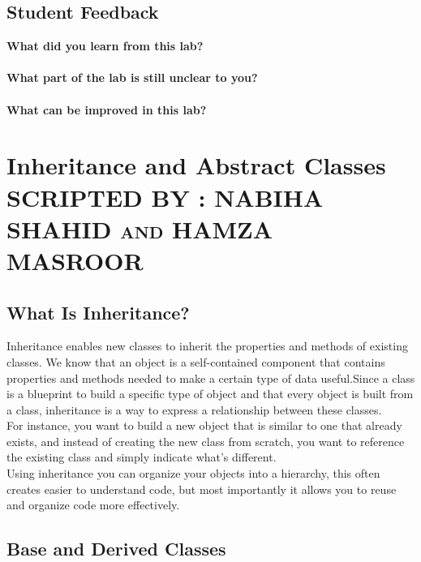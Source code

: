 \documentclass[11pt,fleqn]{book} %
\begin{document}
\newpage
\section{Student Feedback}
\textbf{What did you learn from this lab?}\\
\noindent\fbox{\parbox{\textwidth}{
  }
}\\
\textbf{What part of the lab is still unclear to you?}\\
\noindent\fbox{\parbox{\textwidth}{
  }
}\\
\textbf{What can be improved in this lab?}\\ 
\noindent\fbox{\parbox{\textwidth}{
  }
}

\newpage


\chapter{Inheritance and Abstract Classes \hspace{65mm} {\textsc{\small SCRIPTED BY : NABIHA SHAHID and HAMZA MASROOR}}}

\section{What Is Inheritance?}

Inheritance enables new classes to inherit the properties and methods of existing classes. We know that an object is a self-contained component that contains properties and methods needed to make a certain type of data useful.Since a class is a blueprint to build a specific type of object and that every object is built from a class, inheritance is a way to express a relationship between these classes.\\
For instance, you want to build a new object that is similar to one that already exists, and instead of creating the new class from scratch, you want to reference the existing class and simply indicate what's different.\\
Using inheritance you can organize your objects into a hierarchy, this often creates easier to understand code, but most importantly it allows you to reuse and organize code more effectively.

\section{Base and Derived Classes}
\end{document}
